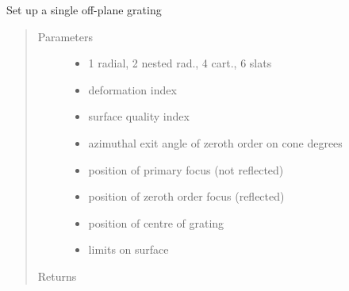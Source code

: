\documentclass[letterpaper,10pt,english]{sphinxmanual}
\begin{document}

\begin{fulllineitems}
\label{\detokenize{xsrt_functions:xsrt.opgrat}}
Set up a single off-plane grating
\begin{quote}\begin{description}
\item[{Parameters}] \leavevmode\begin{itemize}
\item {} 
 \textendash{} 1 radial, 2 nested rad., 4 cart., 6 slats

\item {} 
 \textendash{} deformation index

\item {} 
 \textendash{} surface quality index

\item {} 
 \textendash{} azimuthal exit angle of zeroth order on cone degrees

\item {} 
 \textendash{} position of primary focus (not reflected)

\item {} 
 \textendash{} position of zeroth order focus (reflected)

\item {} 
 \textendash{} position of centre of grating

\item {} 
 \textendash{} limits on surface

\end{itemize}

\item[{Returns}] \leavevmode




\end{description}
\end{quote}
\end{fulllineitems}
\end{document}
